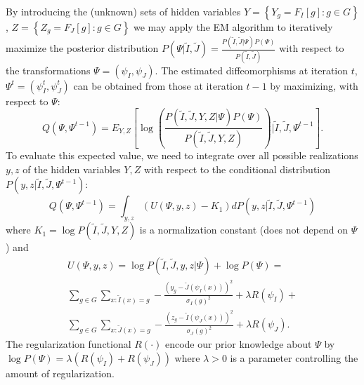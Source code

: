 \documentclass[11pt]{article}
\begin{document}
By introducing the (unknown) sets of hidden variables $Y = \left\lbrace Y_{g}=F_{I}[g] : g\in G \right\rbrace$, $Z = \left\lbrace Z_g = F_{J}[g] : g \in G\right\rbrace$ we may
apply the EM algorithm to iteratively maximize the posterior distribution
$P(\Psi | \tilde{I}, \tilde{J}) = \frac{P(\tilde{I}, \tilde{J} | \Psi)P(\Psi)}{P(\tilde{I}, \tilde{J})}$ with respect to the transformations
$\Psi = (\psi_{I}, \psi_{J})$. The estimated diffeomorphisms at iteration $t$, $\Psi^{t} = \left( \psi_{I}^{t}, \psi_{J}^{t}\right)$ can be obtained from those at iteration
$t-1$ by maximizing, with respect to $\Psi$:
\begin{equation}
	Q(\Psi, \Psi^{t-1}) = E_{Y,Z}\left[\log \left( \frac{P(\tilde{I}, \tilde{J}, Y, Z|\Psi)P(\Psi)}{P(\tilde{I}, \tilde{J}, Y, Z)}\right) | \tilde{I}, \tilde{J}, \Psi^{t-1}\right].
\end{equation}
To evaluate this expected value, we need to integrate over all possible realizations $y, z$ of the hidden variables $Y, Z$ with respect to the conditional distribution $P(y,z| \tilde{I}, \tilde{J}, \Psi^{t-1})$:
\begin{equation}\label{eq:expected_value}
Q(\Psi, \Psi^{t-1}) = \int_{y,z} (U(\Psi, y, z) - K_1)dP(y,z| \tilde{I}, \tilde{J}, \Psi^{t-1})
\end{equation}
where $K_{1} =\log P(\tilde{I}, \tilde{J}, Y, Z)$ is a normalization constant (does not depend on $\Psi$) and
\begin{align}\label{eq:SyNEM_objective}
	U(\Psi, y, z) = \log P(\tilde{I}, \tilde{J}, y, z|\Psi) + \log P(\Psi)=\\
    \nonumber\sum_{g\in G} \sum_{x : \tilde{I}(x) = g} -\frac{\left(y_g - \tilde{J}(\psi_{I}(x))\right)^{2}}{\sigma_{I}(g)^{2}} + \lambda R(\psi_{I})+\\
    \nonumber\sum_{g\in G} \sum_{x : \tilde{J}(x) = g} -\frac{\left(z_g - \tilde{I}(\psi_{J}(x))\right)^{2}}{\sigma_{J}(g)^{2}} + \lambda R(\psi_{J}).
\end{align}
The regularization functional $R(\cdot)$ encode our prior knowledge about $\Psi$ by $\log P(\Psi) = \lambda \left( R(\psi_{I}) + R(\psi_{J})\right)$ where $\lambda > 0$ is a parameter controlling the amount of regularization.\\
\end{document}
